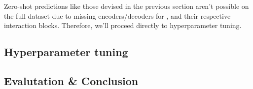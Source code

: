 Zero-shot predictions like those devised in the previous section aren't possible on the full dataset due to missing encoders/decoders for ,  and their respective interaction blocks. Therefore, we'll proceed directly to hyperparameter tuning. 
\subsection{Hyperparameter tuning}
\label{sec:qm9_full_isomers_hyp_tuning}
\begin{table}[H]
    \centering
    \caption[GNN on full QM9 dataset sample with full matrix loss]{GNN on full QM9 dataset sample using full matrix loss to train. Metrics on test set and corresponding hyperparameter settings for 10 best performing networks in terms of iterations.}
    \label{tab:qm9_full_further_runs} 
\end{table}

\subsection{Evalutation \& Conclusion}
\label{sec:qm9_full_isomers_conclusion}

